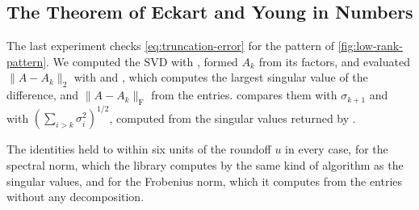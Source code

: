 \subsection{The Theorem of Eckart and Young in Numbers}

The last experiment checks \eqref{eq:truncation-error} for the pattern of \cref{fig:low-rank-pattern}. We computed the SVD with , formed $A_k$ from its factors, and evaluated $\|A-A_k\|_2$ with  and , which computes the largest singular value of the difference, and $\|A-A_k\|_{\mathrm F}$ from the entries.  compares them with $\sigma_{k+1}$ and with $(\sum_{i>k}\sigma_i^2)^{1/2}$, computed from the singular values returned by .

\begin{table}
\end{table}

The identities held to within six units of the roundoff $u$ in every case, for the spectral norm, which the library computes by the same kind of algorithm as the singular values, and for the Frobenius norm, which it computes from the entries without any decomposition.

